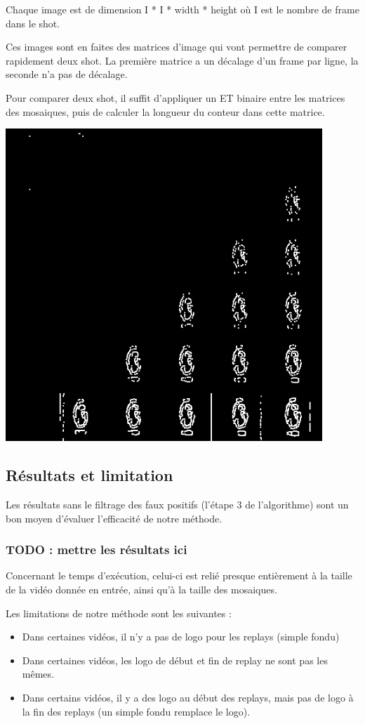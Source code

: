 \documentclass[11pt]{article}
\begin{document}
Chaque image est de dimension I * I * width * height où I est le nombre de frame dans le shot.

Ces images sont en faites des matrices d'image qui vont permettre de comparer rapidement deux shot.
La première matrice a un décalage d'un frame par ligne, la seconde n'a pas de décalage.

Pour comparer deux shot, il suffit d’appliquer un ET binaire entre les matrices des mosaiques, 
puis de calculer la longueur du conteur dans cette matrice.


\includegraphics[width=.9\linewidth]{mosaique3.png}

\subsection{Résultats et limitation}
\label{sec-7-3}
Les résultats sans le filtrage des faux positifs (l’étape 3 de l’algorithme) sont un 
bon moyen d’évaluer l’efficacité de notre méthode. 
\subsubsection{{\bfseries\sffamily TODO} : mettre les résultats ici}
\label{sec-7-3-1}
Concernant le temps d’exécution, celui-ci est relié presque entièrement à la taille de
la vidéo donnée en entrée, ainsi qu’à la taille des mosaiques.

Les limitations de notre méthode sont les suivantes :
\begin{itemize}
\item Dans certaines vidéos, il n’y a pas de logo pour les replays (simple fondu)
\item Dans certaines vidéos, les logo de début et fin de replay ne sont pas les mêmes.
\item Dans certains vidéos, il y a des logo au début des replays, mais pas de logo à
la fin des replays (un simple fondu remplace le logo).
\end{itemize}
\end{document}

